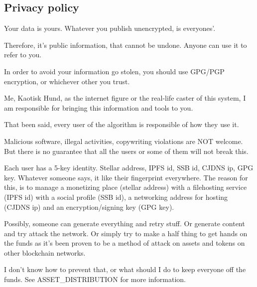 \hypertarget{privacy-policy}{%
\subsection{Privacy policy}\label{privacy-policy}}

Your data is yours. Whatever you publish unencrypted, is everyones'.

Therefore, it's public information, that cannot be undone. Anyone can
use it to refer to you.

In order to avoid your information go stolen, you should use GPG/PGP
encryption, or whichever other you trust.

Me, Kaotisk Hund, as the internet figure or the real-life caster of this
system, I am responsible for bringing this information and tools to you.

That been said, every user of the algorithm is responsible of how they
use it.

Malicious software, illegal activities, copywriting violations are NOT
welcome. But there is no guarantee that all the users or some of them
will not break this.

Each user has a 5-key identity. Stellar address, IPFS id, SSB id, CJDNS
ip, GPG key. Whatever someone says, it like their fingerprint
everywhere. The reason for this, is to manage a monetizing place
(stellar address) with a filehosting service (IPFS id) with a social
profile (SSB id), a networking address for hosting (CJDNS ip) and an
encryption/signing key (GPG key).

Possibly, someone can generate everything and retry stuff. Or generate
content and try attack the network. Or simply try to make a half thing
to get hands on the funds as it's been proven to be a method of attack
on assets and tokens on other blockchain networks.

I don't know how to prevent that, or what should I do to keep everyone
off the funds. See ASSET\_DISTRIBUTION for more information.
